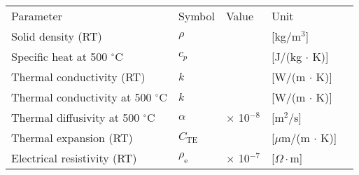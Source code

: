 \documentclass[letterpaper,10pt,english]{jupyterBook}
\begin{document}
	
	\begin{savenotes}\sphinxattablestart
		\sphinxthistablewithglobalstyle
		\centering
		\begin{tabulary}{\linewidth}[t]{TTTTT}
			\sphinxtoprule
			\sphinxstyletheadfamily 
			\sphinxAtStartPar
			Parameter
			&\sphinxstyletheadfamily 
			\sphinxAtStartPar
			Symbol
			&\sphinxstyletheadfamily 
			\sphinxAtStartPar
			Value
			&\sphinxstyletheadfamily 
			\sphinxAtStartPar
			Unit
			&
			\sphinxAtStartPar
			
			\\
			\sphinxmidrule
			\sphinxtableatstartofbodyhook
			\sphinxAtStartPar
			Solid density (RT)
			&
			\sphinxAtStartPar
			\(\rho\)
			&
			&
			\sphinxAtStartPar
			{[}kg/m\(^3\){]}
			&
			\sphinxAtStartPar
			
			\\
			\sphinxhline
			\sphinxAtStartPar
			Specific heat at 500 \(^\circ\)C
			&
			\sphinxAtStartPar
			\(c_p\)
			&
			&
			\sphinxAtStartPar
			{[}J/(kg \(\cdot\) K){]}
			&
			\sphinxAtStartPar
			
			\\
			\sphinxhline
			\sphinxAtStartPar
			Thermal conductivity (RT)
			&
			\sphinxAtStartPar
			\(k\)
			&
			&
			\sphinxAtStartPar
			{[}W/(m \(\cdot\) K){]}
			&
			\sphinxAtStartPar
			
			\\
			\sphinxhline
			\sphinxAtStartPar
			Thermal conductivity at 500 \(^\circ\)C
			&
			\sphinxAtStartPar
			\(k\)
			&
			&
			\sphinxAtStartPar
			{[}W/(m \(\cdot\) K){]}
			&
			\sphinxAtStartPar
			
			\\
			\sphinxhline
			\sphinxAtStartPar
			Thermal diffusivity at 500 \(^\circ\)C
			&
			\sphinxAtStartPar
			\(\alpha\)
			&
			 \(\times\) 10\(^{-8}\)
			&
			\sphinxAtStartPar
			{[}m\(^2\)/s{]}
			&
			\sphinxAtStartPar
			
			\\
			\sphinxhline
			\sphinxAtStartPar
			Thermal expansion (RT)
			&
			\sphinxAtStartPar
			\(C_\text{TE}\)
			&
			&
			\sphinxAtStartPar
			{[}\(\mu\)m/(m \(\cdot\) K){]}
			&
			\sphinxAtStartPar
			
			\\
			\sphinxhline
			\sphinxAtStartPar
			Electrical resistivity (RT)
			&
			\sphinxAtStartPar
			\(\rho_\text{e}\)
			&
			 \(\times\) 10\(^{-7}\)
			&
			\sphinxAtStartPar
			{[}\(\Omega \cdot\)m{]}
			&
			\sphinxAtStartPar
			

\end{tabulary}
\end{savenotes}
\end{document}
